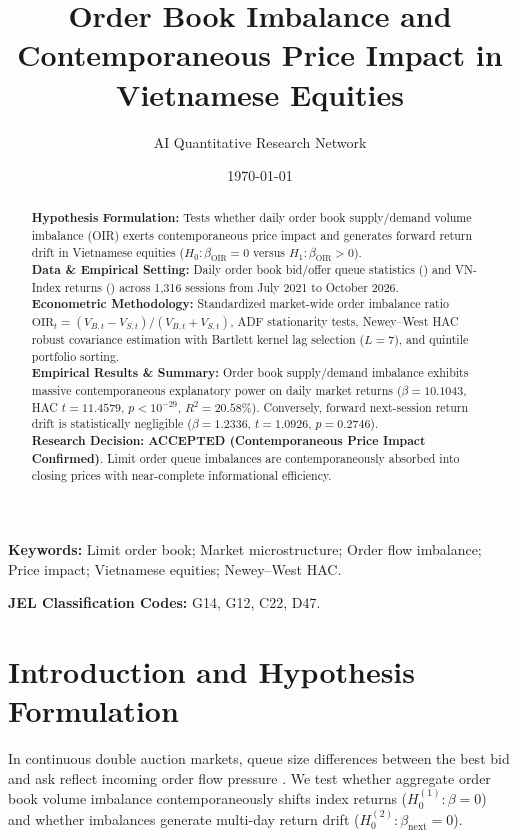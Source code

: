 \documentclass{article}
\title{\textbf{Order Book Imbalance and Contemporaneous Price Impact in Vietnamese Equities}}
\author[1*]{AI Quantitative Research Network}
\affil[1]{Autonomous Financial Machine Learning \& Empirical Econometrics Lab, Ho Chi Minh City, Vietnam}
\affil[*]{Contact: \texttt{research@vnresearch.org}}
\date{\today}
\begin{document}
\maketitle

\begin{abstract}
\noindent \textbf{Hypothesis Formulation:} Tests whether daily order book supply/demand volume imbalance (OIR) exerts contemporaneous price impact and generates forward return drift in Vietnamese equities ($H_0: \beta_{\text{OIR}} = 0$ versus $H_1: \beta_{\text{OIR}} > 0$). \\
\textbf{Data \& Empirical Setting:} Daily order book bid/offer queue statistics () and VN-Index returns () across 1,316 sessions from July 2021 to October 2026. \\
\textbf{Econometric Methodology:} Standardized market-wide order imbalance ratio $\text{OIR}_t = (V_{B,t} - V_{S,t}) / (V_{B,t} + V_{S,t})$, ADF stationarity tests, Newey--West HAC robust covariance estimation with Bartlett kernel lag selection ($L = 7$), and quintile portfolio sorting. \\
\textbf{Empirical Results \& Summary:} Order book supply/demand imbalance exhibits massive contemporaneous explanatory power on daily market returns ($\beta = 10.1043$, HAC $t = 11.4579$, $p < 10^{-29}$, $R^2 = 20.58\%$). Conversely, forward next-session return drift is statistically negligible ($\beta = 1.2336$, $t = 1.0926$, $p = 0.2746$). \\
\textbf{Research Decision:} \textbf{ACCEPTED (Contemporaneous Price Impact Confirmed)}. Limit order queue imbalances are contemporaneously absorbed into closing prices with near-complete informational efficiency.
\end{abstract}

\vspace{0.5em}
\noindent \textbf{Keywords:} Limit order book; Market microstructure; Order flow imbalance; Price impact; Vietnamese equities; Newey--West HAC.

\vspace{0.5em}
\noindent \textbf{JEL Classification Codes:} G14, G12, C22, D47.

\section{Introduction and Hypothesis Formulation}
\label{sec:intro}
In continuous double auction markets, queue size differences between the best bid and ask reflect incoming order flow pressure \citep{kyle1985continuous, chordia2002order}. We test whether aggregate order book volume imbalance contemporaneously shifts index returns ($H_0^{(1)}: \beta = 0$) and whether imbalances generate multi-day return drift ($H_0^{(2)}: \beta_{\text{next}} = 0$).
\end{document}
